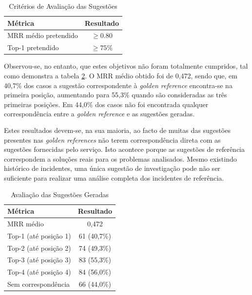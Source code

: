 		\begin{table}[H]
			\centering
			\small
			\begin{tabular}{lc}
				\hline
				\textbf{Métrica} & \textbf{Resultado} \\
				\hline
				\gls{MRR} médio pretendido & $\geq0.80$ \\
				\hline
				Top-1 pretendido & $\geq75\%$ \\
				\hline
			\end{tabular}
			\caption[Critérios de Avaliação das Sugestões]{Critérios de Avaliação das Sugestões}
			\label{tab:classificacao-sugestoes}
		\end{table}
		
		Observou-se, no entanto, que estes objetivos não foram totalmente cumpridos, tal como demonstra a tabela \ref{tab:avaliacao-sugestoes}. O \gls{MRR} médio obtido foi de 0,472, sendo que,  em 40,7\% dos casos a sugestão correspondente à \textit{golden reference} encontra-se na primeira posição, aumentando para 55,3\% quando são consideradas as três primeiras posições. Em 44,0\% dos casos não foi encontrada qualquer correspondência entre a \textit{golden reference} e as sugestões geradas.
	
		Estes resultados devem-se, na sua maioria, ao facto de muitas das sugestões presentes nas \textit{golden references} não terem correspondência direta com as sugestões fornecidas pelo serviço. Isto acontece porque as sugestões de referência correspondem a soluções reais para os problemas analisados. Mesmo existindo histórico de incidentes, uma única sugestão de investigação pode não ser suficiente para realizar uma análise completa dos incidentes de referência.
		
		\begin{table}[H]
			\centering
			\small
			\begin{tabular}{lc}
				\hline
				\textbf{Métrica} & \textbf{Resultado} \\
				\hline
				\gls{MRR} médio & 0,472 \\
				\hline
				Top-1 (até posição 1) & 61 (40,7\%) \\
				\hline
				Top-2 (até posição 2) & 74 (49,3\%) \\
				\hline
				Top-3 (até posição 3) & 83 (55,3\%) \\
				\hline
				Top-4 (até posição 4) & 84 (56,0\%) \\
				\hline
				Sem correspondência & 66 (44,0\%) \\
				\hline
			\end{tabular}
			\caption[Avaliação das Sugestões Geradas]{Avaliação das Sugestões Geradas}
			\label{tab:avaliacao-sugestoes}
		\end{table}
		
